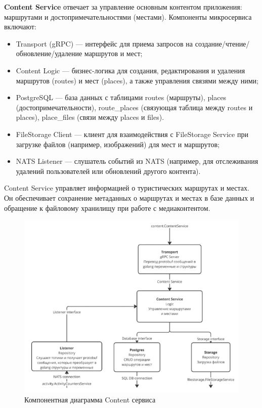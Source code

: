 \textbf{Content Service} отвечает за управление основным контентом приложения: маршрутами и достопримечательностями (местами). Компоненты микросервиса включают:
\begin{itemize}
    \item Transport (gRPC) — интерфейс для приема запросов на создание/чтение/обновление/удаление маршрутов и мест;
    \item Content Logic — бизнес-логика для создания, редактирования и удаления маршрутов (routes) и мест (places), а также управления связями между ними;
    \item PostgreSQL — база данных с таблицами routes (маршруты), places (достопримечательности), route\_places (связующая таблица между routes и places), place\_files (связи между places и files).
    \item FileStorage Client — клиент для взаимодействия с FileStorage Service при загрузке файлов (например, изображений) для мест и маршрутов;
    \item NATS Listener — слушатель событий из NATS (например, для отслеживания удалений пользователей или обновлений другого контента).
\end{itemize}
\noindent Content Service управляет информацией о туристических маршрутах и местах. Он обеспечивает сохранение метаданных о маршрутах и местах в базе данных и обращение к файловому хранилищу при работе с медиаконтентом.
\begin{figure}[H]
        \centering
        \includegraphics[width=0.8\linewidth]{Images/second_chapter_backend_architecture/Picture6.png}
        \caption{Компонентная диаграмма Content сервиса}
        \label{fig:content-service-component-diagram}
\end{figure}

